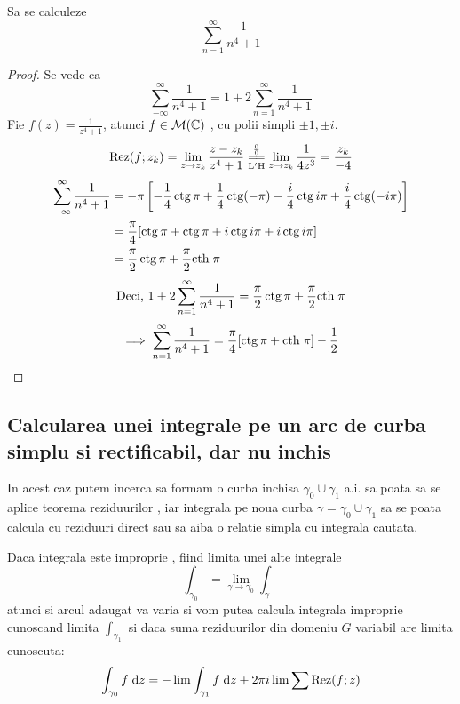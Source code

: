\begin{aplicatie}
    Sa se calculeze \[ \sum_{n=1}^{\infty} \frac{1}{n^4 + 1}\]
    \begin{proof}
        Se vede ca
        \[
            \sum_{-\infty}^{\infty} \frac{1}{n^4 + 1} = 1 + 2 \sum_{n=1}^{\infty} \frac{1}{n^4 + 1}
        \]
        Fie $\displaystyle f(z) = \frac{1}{z^4+1}$, atunci $f\in \mathcal{M}(\mathbb{C})$ , cu polii simpli $\pm 1, \pm i$.
        \[
            \Rez(f;z_k) = \lim_{z \to z_k} \frac{z-z_k}{z^4+1}
                \EqConformCaz \lim_{z \to z_k} \frac{1}{4z^3}
                =\frac{z_k}{-4}
        \]
        \begin{align*}
          \sum_{-\infty}^{\infty} \frac{1}{n^4 + 1}
            &= - \pi \left[-\frac{1}{4} \operatorname{ctg} \pi + \frac{1}{4} \operatorname{ctg}(-\pi)
              - \frac{i}{4} \operatorname{ctg} i\pi + \frac{i}{4}\operatorname{ctg}(-i\pi)\right] \\
            &= \frac{\pi}{4}[\operatorname{ctg} \pi + \operatorname{ctg} \pi + i\operatorname{ctg} i\pi + i\operatorname{ctg} i\pi] \\
            &= \frac{\pi}{2} \operatorname{ctg} \pi + \frac{\pi}{2} \mathrm{cth}\; \pi
        \end{align*}
        \[
            \text{Deci, } 1 + 2 \sum_{n=1}^{\infty} \frac{1}{n^4 + 1}
                = \frac{\pi}{2} \operatorname{ctg} \pi + \frac{\pi}{2} \mathrm{cth}\; \pi
        \]
        \[
            \implies \sum_{n=1}^{\infty} \frac{1}{n^4 + 1}
                = \frac{\pi}{4} [\operatorname{ctg} \pi + \mathrm{cth}\; \pi ] - \frac{1}{2}
        \]

    \end{proof}
\end{aplicatie}

\subsection{Calcularea unei integrale pe un arc de curba simplu si rectificabil, dar nu inchis}

    In acest caz putem incerca sa formam o curba inchisa $\gamma_0 \cup \gamma_1$
    a.i. sa poata sa se aplice teorema reziduurilor , iar integrala pe noua curba
    $\gamma=\gamma_0 \cup \gamma_1$ sa se poata calcula cu
    reziduuri direct sau sa aiba o relatie simpla cu integrala cautata.

    Daca integrala este improprie , fiind limita unei alte integrale
    \[
        \int_{\gamma_0}= \lim_{\gamma \to \gamma_0} \int_{\gamma}
    \]
    atunci si arcul adaugat va varia si vom putea calcula integrala improprie
    cunoscand limita $\int_{\gamma_1}$ si daca  suma reziduurilor din domeniu $G$
    variabil are limita cunoscuta:
    \[
        \int_{\gamma_0} f \; \mathrm{d} z = - \lim \int_{\gamma_1} f \; \mathrm{d} z + 2 \pi i \lim \sum \operatorname{Rez} (f;z)
    \]

